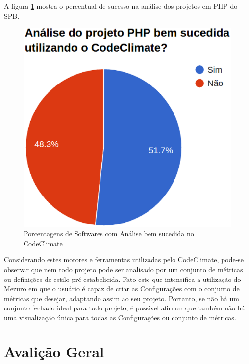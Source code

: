 A figura \ref{fig:is_codeclimate_php_success} mostra o percentual de sucesso na
análise dos projetos em PHP do SPB.

\begin{figure}[!htb]
	\centering
    \includegraphics[keepaspectratio=true,scale=0.6]
    {figuras/is_codeclimate_php_success.eps}
  \caption{Porcentagens de Softwares com Análise bem sucedida no CodeClimate}
  \label{fig:is_codeclimate_php_success}
\end{figure}

\newpage

Considerando estes motores e ferramentas utilizadas pelo CodeClimate, pode-se
observar que nem todo projeto pode ser analisado por um conjunto de métricas ou
definições de estilo pré estabelicida. Fato este que intensifica a utilização do
Mezuro em que o usuário é capaz de criar as Configurações com o conjunto de
métricas que desejar, adaptando assim ao seu projeto. Portanto, se não há um
conjunto fechado ideal para todo projeto, é possível afirmar que também não há
uma visualização única para todas as Configurações ou conjunto de métricas.




\section{Avalição Geral}


